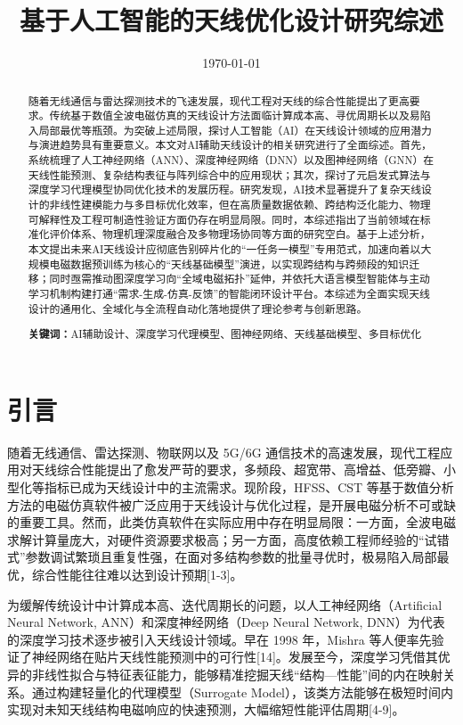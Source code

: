 \documentclass[UTF8,a4paper,12pt]{ctexart}
\title{基于人工智能的天线优化设计研究综述}
\author{}
\date{\today}
\begin{document}
\maketitle
\tableofcontents
\newpage
\begin{abstract}

随着无线通信与雷达探测技术的飞速发展，现代工程对天线的综合性能提出了更高要求。传统基于数值全波电磁仿真的天线设计方法面临计算成本高、寻优周期长以及易陷入局部最优等瓶颈。为突破上述局限，探讨人工智能（AI）在天线设计领域的应用潜力与演进趋势具有重要意义。本文对AI辅助天线设计的相关研究进行了全面综述。首先，系统梳理了人工神经网络（ANN）、深度神经网络（DNN）以及图神经网络（GNN）在天线性能预测、复杂结构表征与阵列综合中的应用现状；其次，探讨了元启发式算法与深度学习代理模型协同优化技术的发展历程。研究发现，AI技术显著提升了复杂天线设计的非线性建模能力与多目标优化效率，但在高质量数据依赖、跨结构泛化能力、物理可解释性及工程可制造性验证方面仍存在明显局限。同时，本综述指出了当前领域在标准化评价体系、物理机理深度融合及多物理场协同等方面的研究空白。基于上述分析，本文提出未来AI天线设计应彻底告别碎片化的“一任务一模型”专用范式，加速向着以大规模电磁数据预训练为核心的“天线基础模型”演进，以实现跨结构与跨频段的知识迁移；同时亟需推动图深度学习向“全域电磁拓扑”延伸，并依托大语言模型智能体与主动学习机制构建打通“需求-生成-仿真-反馈”的智能闭环设计平台。本综述为全面实现天线设计的通用化、全域化与全流程自动化落地提供了理论参考与创新思路。

\par\noindent\textbf{关键词：}AI辅助设计、深度学习代理模型、图神经网络、天线基础模型、多目标优化

\end{abstract}

\section{引言}
随着无线通信、雷达探测、物联网以及 5G/6G 通信技术的高速发展，现代工程应用对天线综合性能提出了愈发严苛的要求，多频段、超宽带、高增益、低旁瓣、小型化等指标已成为天线设计中的主流需求。现阶段，HFSS、CST 等基于数值分析方法的电磁仿真软件被广泛应用于天线设计与优化过程，是开展电磁分析不可或缺的重要工具。然而，此类仿真软件在实际应用中存在明显局限：一方面，全波电磁求解计算量庞大，对硬件资源要求极高；另一方面，高度依赖工程师经验的“试错式”参数调试繁琐且重复性强，在面对多结构参数的批量寻优时，极易陷入局部最优，综合性能往往难以达到设计预期[1-3]。

为缓解传统设计中计算成本高、迭代周期长的问题，以人工神经网络（Artificial Neural Network, ANN）和深度神经网络（Deep Neural Network, DNN）为代表的深度学习技术逐步被引入天线设计领域。早在 1998 年，Mishra 等人便率先验证了神经网络在贴片天线性能预测中的可行性[14]。发展至今，深度学习凭借其优异的非线性拟合与特征表征能力，能够精准挖掘天线“结构—性能”间的内在映射关系。通过构建轻量化的代理模型（Surrogate Model），该类方法能够在极短时间内实现对未知天线结构电磁响应的快速预测，大幅缩短性能评估周期[4-9]。
\end{document}
